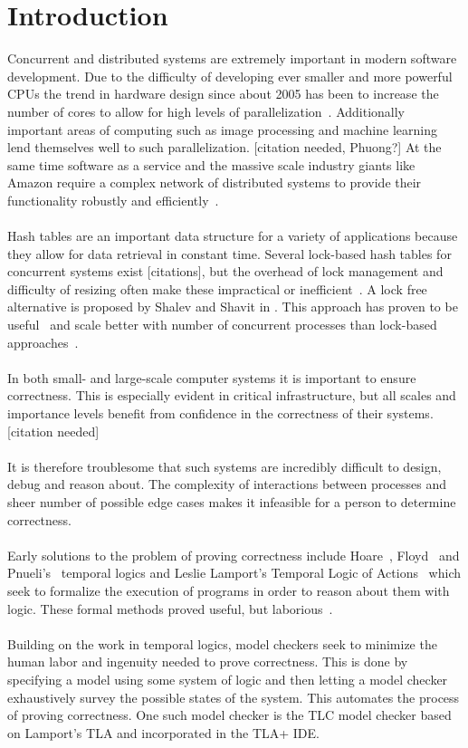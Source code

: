 \documentclass{uit-thesis}
\begin{document}
\chapter{Introduction}
Concurrent and distributed systems are extremely important in modern software development. Due to the difficulty of developing ever smaller and more powerful CPUs the trend in hardware design since about 2005 has been to increase the number of cores to allow for high levels of parallelization~\cite{Tanenbaum2014}. Additionally important areas of computing such as image processing and machine learning lend themselves well to such parallelization. [citation needed, Phuong?] At the same time software as a service and the massive scale industry giants like Amazon require a complex network of distributed systems to provide their functionality robustly and efficiently~\cite{Amazon2015}.
\\\\
Hash tables are an important data structure for a variety of applications because they allow for data retrieval in constant time. Several lock-based hash tables for concurrent systems exist [citations], but the overhead of lock management and difficulty of resizing often make these impractical or inefficient~\cite{Shalev2006}. A lock free alternative is proposed by Shalev and Shavit in \cite{Shalev2006}. This approach has proven to be useful~\cite{lock-free-structures2013} and scale better with number of concurrent processes than lock-based approaches~\cite{Duarte-Haskell2016}.
\\\\
In both small- and large-scale computer systems it is important to ensure correctness. This is especially evident in critical infrastructure, but all scales and importance levels benefit from confidence in the correctness of their systems. [citation needed]
\\\\
It is therefore troublesome that such systems are incredibly difficult to design, debug and reason about. The complexity of interactions between processes and sheer number of possible edge cases makes it infeasible for a person to determine correctness.
\\\\
Early solutions to the problem of proving correctness include Hoare~\cite{Hoare1969}, Floyd~\cite{Floyd1967} and Pnueli's~\cite{Pnueli1977} temporal logics and Leslie Lamport's Temporal Logic of Actions~\cite{Lamport1977} which seek to formalize the execution of programs in order to reason about them with logic. These formal methods proved useful, but laborious~\cite{Clarke2009}.
\\\\
Building on the work in temporal logics, model checkers seek to minimize the human labor and ingenuity needed to prove correctness. This is done by specifying a model using some system of logic and then letting a model checker exhaustively survey the possible states of the system. This automates the process of proving correctness. One such model checker is the TLC model checker based on Lamport's TLA and incorporated in the TLA+ IDE.
\end{document}

